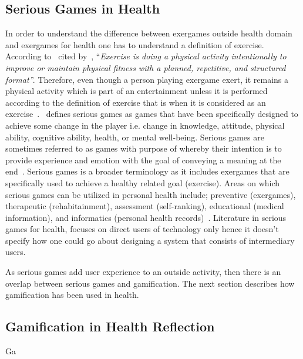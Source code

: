 \subsection{Serious Games in Health}
In order to understand the difference between exergames outside health domain and exergames for health one has to understand a definition of exercise. According to~\cite[p. 126]{caspersen1985physical} cited by~\cite{oh2010defining}, ``\emph{Exercise is doing a physical activity intentionally to improve or maintain physical fitness with a planned, repetitive, and structured format'}'. Therefore, even though a person playing exergame exert, it remains a physical activity which is part of an entertainment unless it is performed according to the definition of exercise that is when it is considered as an exercise~\citep{oh2010defining}.~\cite{mccallum2012gamification} defines serious games as games that have been specifically designed to achieve some change in the player i.e. change in knowledge, attitude, physical ability, cognitive ability, health, or mental well-being. Serious games are sometimes referred to as games with purpose of  whereby their intention is to provide experience and emotion with the goal of conveying a meaning at the end~\citep{marsh2011serious}. Serious games is a broader terminology as it includes exergames that are specifically used to achieve a healthy related goal (exercise). Areas on which serious games can be utilized in personal health include; preventive (exergames), therapeutic (rehabitainment), assessment (self-ranking), educational (medical information), and informatics (personal health records)~\citep{mccallum2012gamification}. Literature in serious games for health, focuses on direct users of technology only hence it doesn't specify how one could go about designing a system that consists of intermediary users.

As serious games add user experience to an outside  activity, then there is an overlap between serious games and gamification. The next section describes how gamification has been used in health.   

\subsection{Gamification in Health Reflection}
Ga
\begin{flushright}
\end{flushright}
